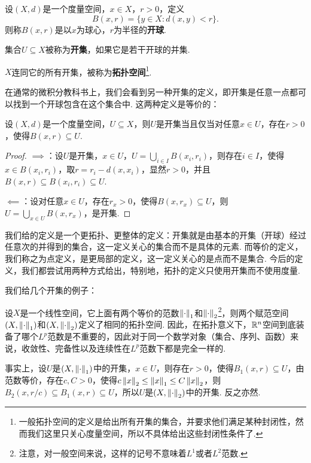 \begin{definition}[开球，开集，拓扑空间]
    设$(X,d)$是一个度量空间，$x\in X$，$r>0$，定义
    \[B(x,r)=\{y\in X:d(x,y)<r\}.\]
    则称$B(x,r)$是以$x$为球心，$r$为半径的\textbf{开球}. 
    
    集合$U\subseteq X$被称为\textbf{开集}，如果它是若干开球的并集. 

    $X$连同它的所有开集，被称为\textbf{拓扑空间}\footnote{一般拓扑空间的定义是给出所有开集的集合，并要求他们满足某种封闭性，然而我们这里只关心度量空间，所以不具体给出这些封闭性条件了. }. 
\end{definition}
在通常的微积分教科书上，我们会看到另一种开集的定义，即开集是任意一点都可以找到一个开球包含在这个集合中. 这两种定义是等价的：

\begin{proposition}\label{prop:open-ball}
    设$(X,d)$是一个度量空间，$U\subseteq X$，则$U$是开集当且仅当对任意$x\in U$，存在$r>0$，使得$B(x,r)\subseteq U$.
\end{proposition}
\begin{proof}
   $\implies$：设$U$是开集，$x\in U$，$U=\bigcup_{i\in I}B(x_i,r_i)$，则存在$i\in I$，使得$x\in B(x_i,r_i)$，取$r=r_i-d(x,x_i)$，显然$r>0$，并且$B(x,r)\subseteq B(x_i,r_i)\subseteq U$.

    $\impliedby$：设对任意$x\in U$，存在$r_x>0$，使得$B(x,r_x)\subseteq U$，则$U=\bigcup_{x\in U}B(x,r_x)$，是开集. 
\end{proof}
我们给的定义是一个更拓扑、更整体的定义：开集就是由基本的开集（开球）经过任意次的并得到的集合，这一定义关心的集合而不是具体的元素. 而等价的定义，我们称之为点定义，是更局部的定义，这一定义关心的是点而不是集合. 今后的定义，我们都尝试用两种方式给出，特别地，拓扑的定义只使用开集而不使用度量. 


我们给几个开集的例子：
\begin{example}[范等价拓扑空间]\label{ex:lp-topology}
    设$X$是一个线性空间，它上面有两个等价的范数$\left\|\cdot\right\|_1$和$\left\|\cdot\right\|_2$\footnote{注意，对一般空间来说，这样的记号不意味着$L^1$或者$L^2$范数. }，则两个赋范空间$(X,\left\|\cdot\right\|_1)$和$(X,\left\|\cdot\right\|_2)$定义了相同的拓扑空间. 因此，在拓扑意义下，$\mathbb{R}^n$空间到底装备了哪个$L^p$范数是不重要的，因此对于同一个数学对象（集合、序列、函数）来说，收敛性、完备性以及连续性在$L^p$范数下都是完全一样的. 

    事实上，设$U$是$(X,\left\|\cdot\right\|_1)$中的开集，$x\in U$，则存在$r>0$，使得$B_1(x,r)\subseteq U$，由范数等价，存在$c,C>0$，使得$c\left\|x\right\|_2\leq \left\|x\right\|_1\leq C\left\|x\right\|_2$，则$B_2(x,r/c)\subseteq B_1(x,r)\subseteq U$，所以$U$是$(X,\left\|\cdot\right\|_2)$中的开集. 反之亦然. 
\end{example}

